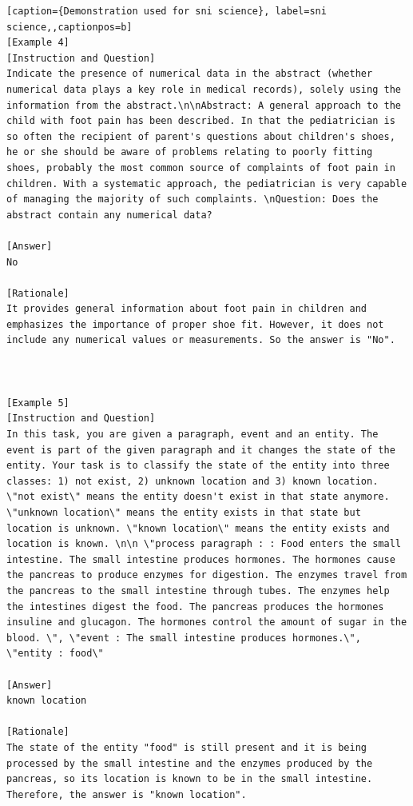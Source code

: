 \begin{lstlisting}[caption={Demonstration used for sni science}, label=sni science,,captionpos=b]
[Example 4]
[Instruction and Question]
Indicate the presence of numerical data in the abstract (whether numerical data plays a key role in medical records), solely using the information from the abstract.\n\nAbstract: A general approach to the child with foot pain has been described. In that the pediatrician is so often the recipient of parent's questions about children's shoes, he or she should be aware of problems relating to poorly fitting shoes, probably the most common source of complaints of foot pain in children. With a systematic approach, the pediatrician is very capable of managing the majority of such complaints. \nQuestion: Does the abstract contain any numerical data?

[Answer]
No

[Rationale]
It provides general information about foot pain in children and emphasizes the importance of proper shoe fit. However, it does not include any numerical values or measurements. So the answer is "No".



[Example 5]
[Instruction and Question]
In this task, you are given a paragraph, event and an entity. The event is part of the given paragraph and it changes the state of the entity. Your task is to classify the state of the entity into three classes: 1) not exist, 2) unknown location and 3) known location. \"not exist\" means the entity doesn't exist in that state anymore. \"unknown location\" means the entity exists in that state but location is unknown. \"known location\" means the entity exists and location is known. \n\n \"process paragraph : : Food enters the small intestine. The small intestine produces hormones. The hormones cause the pancreas to produce enzymes for digestion. The enzymes travel from the pancreas to the small intestine through tubes. The enzymes help the intestines digest the food. The pancreas produces the hormones insuline and glucagon. The hormones control the amount of sugar in the blood. \", \"event : The small intestine produces hormones.\", \"entity : food\"

[Answer]
known location

[Rationale]
The state of the entity "food" is still present and it is being processed by the small intestine and the enzymes produced by the pancreas, so its location is known to be in the small intestine. Therefore, the answer is "known location".




\end{lstlisting}
